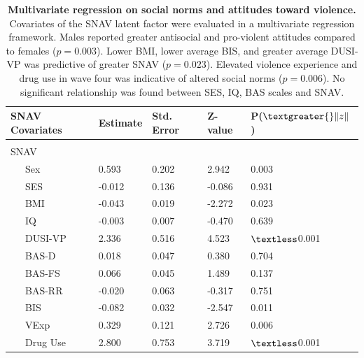 \documentclass[utf8]{article}
\begin{document}
\begin{table}[]
\begin{tabular}{lllll}
SNAV Covariates  & Estimate & Std. Error & Z-value & P($\textgreater{}\|z\|$) \\ \hline \\
SNAV                 &          &            &         &                          \\
\ \ \ Sex              & 0.593    & 0.202      & 2.942   & 0.003                    \\
\ \ \ SES              & -0.012   & 0.136      & -0.086  & 0.931                    \\
\ \ \ BMI              & -0.043   & 0.019      & -2.272  & 0.023                    \\
\ \ \ IQ               & -0.003   & 0.007      & -0.470  & 0.639                    \\
\ \ \ DUSI-VP          & 2.336    & 0.516      & 4.523   & $\textless$0.001                    \\
\ \ \ BAS-D            & 0.018    & 0.047      & 0.380   & 0.704                    \\
\ \ \ BAS-FS           & 0.066    & 0.045      & 1.489   & 0.137                    \\
\ \ \ BAS-RR           & -0.020   & 0.063      & -0.317  & 0.751                    \\
\ \ \ BIS              & -0.082   & 0.032      & -2.547  & 0.011                   \\
\ \ \ VExp             & 0.329    & 0.121      & 2.726   & 0.006                    \\
\ \ \ Drug Use           & 2.800    & 0.753      & 3.719   & $\textless$0.001                    
\end{tabular}
\caption{\textbf{Multivariate regression on social norms and attitudes toward violence.} Covariates of the SNAV latent factor were evaluated in a multivariate regression framework. Males reported greater antisocial and pro-violent attitudes compared to females ($p=0.003$). Lower BMI, lower average BIS, and greater average DUSI-VP was predictive of greater SNAV ($p=0.023$). Elevated violence experience and drug use in wave four was indicative of altered social norms ($p=0.006$). No significant relationship was found between SES, IQ, BAS scales and SNAV. \label{tab:10}}
\end{table}
\end{document}
